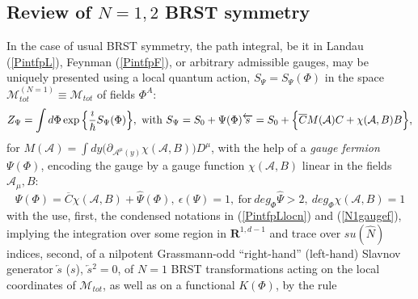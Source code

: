 \documentclass[10pt]{article}
\begin{document}
\subsection{ Review of $N=1, 2$ BRST symmetry}

\label{N12SUSY}

In the case of usual BRST symmetry, the path integral, be it in Landau (\ref{PintfpL}),
Feynman (\ref{PintfpF}), or arbitrary admissible gauges, may be uniquely presented using
a local quantum action, $S_\Psi=S_\Psi(\Phi)$ in the space
$\mathcal{M}^{(N=1)}_{tot}\equiv \mathcal{M}_{tot} $ of fields $\Phi^A$:
\begin{eqnarray}\label{PintfpLlocn}
  &\hspace{-1em}& Z_\Psi =  \int  d \Phi   \exp \Big\{\frac{\imath}{\hbar}S_\Psi(\Phi)\Big\}, \ \mathrm{with}  \ S_\Psi  = S_0+ \Psi(\Phi) \overleftarrow{s}  = S_0+ \Big\{\overline{C}M(\mathcal{A}){C}+\chi( \mathcal{A},B)B\Big\}  ,
\end{eqnarray}
for $ M(\mathcal{A}) = \int d y \big(\partial_{\mathcal{A}^{\mu}(y)}\chi(\mathcal{A},B)\big) D^{\mu }$,
with the help of a \emph{gauge fermion} $\Psi(\Phi)$, encoding the gauge by a gauge function $\chi(\mathcal{A},B)$
linear in the fields $\mathcal{A}_\mu, B$:
\begin{equation}\label{N1gaugef}
  \Psi(\Phi) = \overline{C}\chi(\mathcal{A},B)  +  \widehat{\Psi}(\Phi), \ \epsilon(\Psi) = 1,  \ \mathrm{for} \ deg_{\Phi}\widehat{\Psi}>2 , \ deg_{\Phi}\chi(\mathcal{A},B)=1
\end{equation}
with the use,  first,  the condensed notations in (\ref{PintfpLlocn}) and  (\ref{N1gaugef}), implying the integration over some region in $\mathbf{R}^{1,d-1}$ and trace
over $su(\hat{N})$ indices, second,  of a nilpotent Grassmann-odd ``right-hand'' (left-hand) Slavnov generator
$\overleftarrow{s}$ ($s$), $\overleftarrow{s}{}^2=0$, \cite{Slavnov1} of
$N=1$ BRST transformations acting on the local coordinates of $\mathcal{M}_{tot}$,
as well as on a functional $K(\Phi)$, by the rule \cite{brs, brs1}
\end{document}
